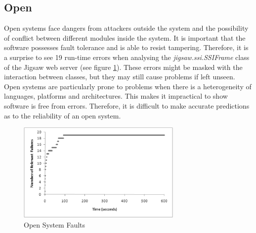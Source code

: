 \documentclass[runningheads,a4paper]{llncs}
\begin{document}
\subsection*{Open}
Open systems face dangers from attackers outside the system and the possibility of conflict between different modules inside the system. It is important that the software possesses fault tolerance and is able to resist tampering. Therefore, it is a surprise to see 19 run-time errors when analysing the \emph{jigsaw.ssi.SSIFrame} class of the Jigsaw web server (see figure \ref{open}). These errors might be masked with the interaction between classes, but they may still cause problems if left unseen. Open systems are particularly prone to problems when there is a heterogeneity of languages, platforms and architectures. This makes it impractical to show software is free from errors. Therefore, it is difficult to make accurate predictions as to the reliability of an open system. 
\begin{figure}[!h]
\centering
\includegraphics[width=80mm]{figures/open.eps}
\caption{Open System Faults}
\label{open}
\end{figure}
\end{document}
